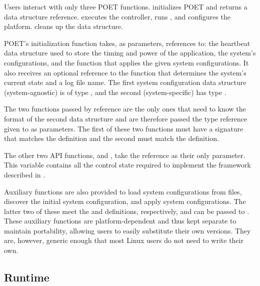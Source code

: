 Users interact with only three POET functions.
 initializes POET and returns a  data structure reference.
 executes the controller, runs , and configures the platform.
 cleans up the  data structure.

POET's initialization function takes, as parameters, references to: the heartbeat data structure used to store the timing and power of the application, the system's configurations, and the function that applies the given system configurations.
It also receives an optional reference to the function that determines the system's current state and a log file name.
The first system configuration data structure (system-agnostic) is of type , and the second (system-specific) has type .

The two functions passed by reference are the only ones that need to know the format of the second data structure and are therefore passed the  type reference given to  as parameters.
The first of these two functions must have a signature that matches the  definition and the second must match the  definition.

The other two API functions,  and , take the  reference as their only parameter.
This variable contains all the control state required to implement the framework described in .

Auxiliary functions are also provided to load system configurations from files, discover the initial system configuration, and apply system configurations.
The latter two of these meet the  and  definitions, respectively, and can be passed to .
These auxiliary functions are platform-dependent and thus kept separate to maintain portability, allowing users to easily substitute their own versions.
They are, however, generic enough that most Linux users do not need to write their own.


\subsection{Runtime}

